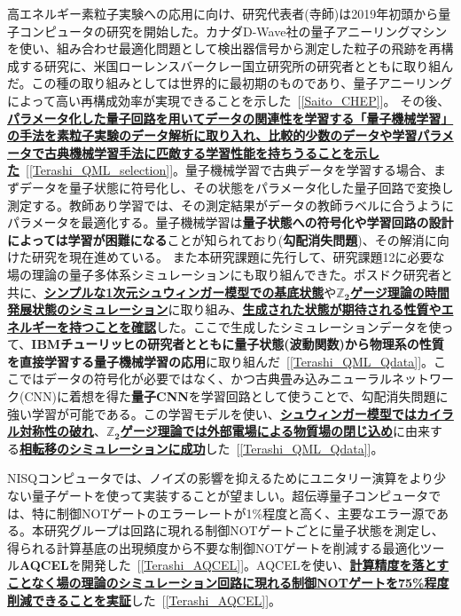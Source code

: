 \documentclass[11pt,a4j,dvipdfmx]{jarticle} 					%
\newcommand{\研究課題名}{誤り耐性量子コンピュータに向けた誤り訂正技術の開発(仮)}
\newcommand{\研究機関名}{東京大学}
\newcommand{\研究代表者氏名}{寺師弘二}
\newcommand{\研究期間の最終元号年度}{10}  %
\newcommand{\mybf}[1]{{\bfseries\sffamily#1}}
\newcommand{\maruone}{\raise0.2mm\hbox{\textcircled{\scriptsize{1}}}}
\newcommand{\marutwo}{\raise0.2mm\hbox{\textcircled{\scriptsize{2}}}}
\begin{document}
高エネルギー素粒子実験への応用に向け、研究代表者(寺師)は2019年初頭から量子コンピュータの研究を開始した。カナダD-Wave社の量子アニーリングマシンを使い、組み合わせ最適化問題として検出器信号から測定した粒子の飛跡を再構成する研究に、米国ローレンスバークレー国立研究所の研究者とともに取り組んだ。この種の取り組みとしては世界的に最初期のものであり、量子アニーリングによって高い再構成効率が実現できることを示した~[\ref{Saito_CHEP}]。
その後、\mybf{\ul{パラメータ化した量子回路を用いてデータの関連性を学習する「量子機械学習」の手法を素粒子実験のデータ解析に取り入れ、比較的少数のデータや学習パラメータで古典機械学習手法に匹敵する学習性能を持ちうることを示した}}~[\ref{Terashi_QML_selection}]。量子機械学習で古典データを学習する場合、まずデータを量子状態に符号化し、その状態をパラメータ化した量子回路で変換し測定する。教師あり学習では、その測定結果がデータの教師ラベルに合うようにパラメータを最適化する。量子機械学習は\mybf{量子状態への符号化や学習回路の設計によっては学習が困難になる}ことが知られており(\mybf{勾配消失問題})、その解消に向けた研究を現在進めている。
また本研究課題に先行して、研究課題{\maruone}{\marutwo}に必要な場の理論の量子多体系シミュレーションにも取り組んできた。ポスドク研究者と共に、\mybf{\ul{シンプルな1次元シュウィンガー模型での基底状態}}や\underline{\mybf{$\pmb{\mathbb{Z}_2}$ゲージ理論の時間発展状態のシミュレーション}}に取り組み、\mybf{\ul{生成された状態が期待される性質やエネルギーを持つことを確認}}した。ここで生成したシミュレーションデータを使って、\mybf{IBMチューリッヒの研究者とともに量子状態(波動関数)から物理系の性質を直接学習する量子機械学習の応用}に取り組んだ~[\ref{Terashi_QML_Qdata}]。ここではデータの符号化が必要ではなく、かつ古典畳み込みニューラルネットワーク(CNN)に着想を得た\mybf{量子CNN}を学習回路として使うことで、勾配消失問題に強い学習が可能である。この学習モデルを使い、\mybf{\ul{シュウィンガー模型ではカイラル対称性の破れ}}、\underline{\mybf{$\pmb{\mathbb{Z}_2}$ゲージ理論では外部電場による物質場の閉じ込め}}に由来する\mybf{\ul{相転移のシミュレーションに成功}}した~[\ref{Terashi_QML_Qdata}]。

NISQコンピュータでは、ノイズの影響を抑えるためにユニタリー演算をより少ない量子ゲートを使って実装することが望ましい。超伝導量子コンピュータでは、特に制御NOTゲートのエラーレートが1\%程度と高く、主要なエラー源である。本研究グループは回路に現れる制御NOTゲートごとに量子状態を測定し、得られる計算基底の出現頻度から不要な制御NOTゲートを削減する最適化ツール\mybf{AQCEL}を開発した~[\ref{Terashi_AQCEL}]。AQCELを使い、\mybf{\ul{計算精度を落とすことなく場の理論のシミュレーション回路に現れる制御NOTゲートを75\%程度削減できることを実証}}した~[\ref{Terashi_AQCEL}]。
\end{document}
